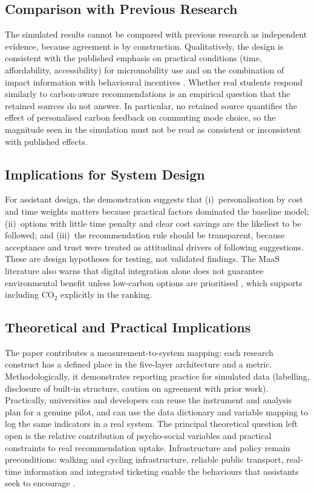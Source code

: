 \documentclass[11pt,a4paper]{article}
\begin{document}
\subsection{Comparison with Previous Research}
The simulated results cannot be compared with previous research as independent evidence, because
agreement is by construction. Qualitatively, the design is consistent with the published emphasis on
practical conditions (time, affordability, accessibility) for micromobility use \citep{wu2025} and on
the combination of impact information with behavioural incentives \citep{eslami2025,niazi2024}.
Whether real students respond similarly to carbon-aware recommendations is an empirical question that
the retained sources do not answer. In particular, no retained source quantifies the effect of
personalised carbon feedback on commuting mode choice, so the magnitude seen in the simulation must
not be read as consistent or inconsistent with published effects.

\subsection{Implications for System Design}
For assistant design, the demonstration suggests that (i)~personalisation by cost and time weights
matters because practical factors dominated the baseline model; (ii)~options with little time penalty
and clear cost savings are the likeliest to be followed; and (iii)~the recommendation rule should be
transparent, because acceptance and trust were treated as attitudinal drivers of following
suggestions. These are design hypotheses for testing, not validated findings. The MaaS literature also
warns that digital integration alone does not guarantee environmental benefit unless low-carbon
options are prioritised \citep{an2025}, which supports including CO$_2$ explicitly in the ranking.

\subsection{Theoretical and Practical Implications}
The paper contributes a measurement-to-system mapping: each research construct has a defined place in
the five-layer architecture and a metric. Methodologically, it demonstrates reporting practice for
simulated data (labelling, disclosure of built-in structure, caution on agreement with prior work).
Practically, universities and developers can reuse the instrument and analysis plan for a genuine
pilot, and can use the data dictionary and variable mapping to log the same indicators in a real
system. The principal theoretical question left open is the relative contribution of psycho-social
variables and practical constraints to real recommendation uptake. Infrastructure and policy remain
preconditions: walking and cycling infrastructure, reliable public transport, real-time information
and integrated ticketing enable the behaviours that assistants seek to encourage
\citep{cui2024,marzolla2025}.
\end{document}
